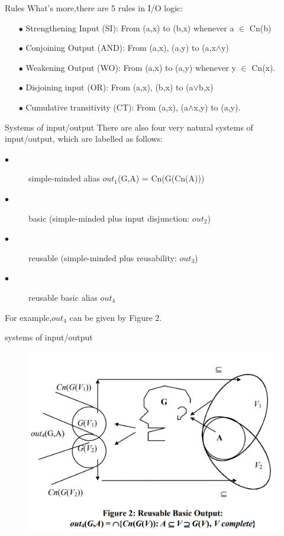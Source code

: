 \documentclass{beamer}
\begin{document}
\begin{frame}{Rules}
What's more,there are 5  rules in I/O logic:
\begin{enumerate}

\item[$\bullet$] Strengthening Input (SI): From (a,x) to (b,x) whenever a $\in$ Cn(b)
\item[$\bullet$] Conjoining Output (AND): From (a,x), (a,y) to (a,x$\wedge$y)
\item[$\bullet$] Weakening Output (WO): From (a,x) to (a,y) whenever y $\in$ Cn(x).
\item[$\bullet$] Disjoining input (OR): From (a,x), (b,x) to (a$\vee$b,x)
\item[$\bullet$] Cumulative transitivity (CT): From (a,x), (a$\wedge$x,y) to (a,y).
\end{enumerate}
    
\end{frame}
\begin{frame}{Systems of input/output}
There are also four very natural systems of input/output, which are labelled as follows: 
\begin{description}
\item[$\bullet$]simple-minded alias $out_{1}$(G,A) = Cn(G(Cn(A)))
\item[$\bullet$]basic (simple-minded plus input disjunction: $out_{2}$)
\item[$\bullet$]reusable (simple-minded plus reusability: $out_{3}$)
\item[$\bullet$]reusable basic alias $out_{4}$
\end{description}
 For example,$out_{4}$ can be given by Figure 2.   
\end{frame}
\begin{frame}{systems of input/output}
\begin{figure}
\centering
\includegraphics[scale=0.3]{out4.png}

\label{fig_framework}
\end{figure}
\end{frame}
\end{document}
